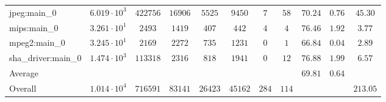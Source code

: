 \begin{tabular}{|l|c|c|c|c|c|c|c|c|c|c|}
jpeg:main\_0            & $ 6.019 \cdot 10^{3} $ & $ 422756 $ & $ 16906 $ & $ 5525  $ & $ 9450  $ & $ 7   $ & $ 58  $ & $ 70.24       $ & $ 0.76    $ & $ 45.30   $ \\
mips:main\_0            & $ 3.261 \cdot 10^{1} $ & $ 2493   $ & $ 1419  $ & $ 407   $ & $ 442   $ & $ 4   $ & $ 4   $ & $ 76.46       $ & $ 1.92    $ & $ 3.77    $ \\
mpeg2:main\_0           & $ 3.245 \cdot 10^{1} $ & $ 2169   $ & $ 2272  $ & $ 735   $ & $ 1231  $ & $ 0   $ & $ 1   $ & $ 66.84       $ & $ 0.04    $ & $ 2.89    $ \\
sha\_driver:main\_0     & $ 1.474 \cdot 10^{3} $ & $ 113318 $ & $ 2316  $ & $ 818   $ & $ 1941  $ & $ 0   $ & $ 12  $ & $ 76.88       $ & $ 1.99    $ & $ 6.57    $ \\
\hline
Average                 & $                    $ & $        $ & $       $ & $       $ & $       $ & $     $ & $     $ & $ 69.81       $ & $ 0.64    $ & $         $ \\
\hline
Overall                 & $ 1.014 \cdot 10^{4} $ & $ 716591 $ & $ 83141 $ & $ 26423 $ & $ 45162 $ & $ 284 $ & $ 114 $ & $             $ & $         $ & $ 213.05  $ \\
\hline
\end{tabular}
